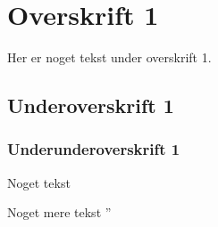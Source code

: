 \section{Overskrift 1}

Her er noget tekst under overskrift 1.

\subsection{Underoverskrift 1}

\subsubsection{Underunderoverskrift 1}

Noget tekst

Noget mere tekst
''
